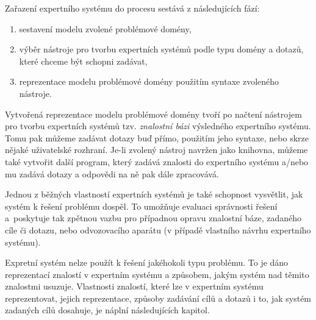 \clearpage
Zařazení expertního systému do procesu sestává z následujících fází:
\begin{enumerate}
  \item sestavení modelu zvolené problémové domény,
  \item výběr nástroje pro tvorbu expertních systémů podle typu domény a dotazů,
    které chceme být schopni zadávat,
  \item reprezentace modelu problémové domény použitím syntaxe zvoleného
    nástroje.
\end{enumerate}
Vytvořená reprezentace modelu problémové domény tvoří po načtení nástrojem pro
tvorbu expertních systémů tzv. \emph{znalostní bázi} výsledného expertního systému.
Tomu pak můžeme zadávat dotazy buď přímo, použitím jeho syntaxe, nebo skrze
nějaké uživatelské rozhraní. Je-li zvolený nástroj navržen jako knihovna, můžeme
také vytvořit další program, který zadává znalosti do expertního systému a/nebo
mu zadává dotazy a odpovědi na ně pak dále zpracovává.

Jednou z běžných vlastností expertních systémů je také schopnost vysvětlit, jak
systém k řešení problému dospěl. To umožňuje evaluaci správnosti řešení
a~poskytuje tak zpětnou vazbu pro případnou opravu znalostní báze, zadaného cíle
či dotazu, nebo odvozovacího aparátu (v případě vlastního návrhu expertního
systému).

Expretní systém nelze použít k řešení jakéhokoli typu problému. To je dáno
reprezentací znalostí v expertním systému a způsobem, jakým systém nad těmito
znalostmi usuzuje. Vlastnosti znalostí, které lze v expertním systému
reprezentovat, jejich reprezentace, způsoby zadávání cílů a dotazů i to, jak
systém zadaných cílů dosahuje, je náplní následujících kapitol.
